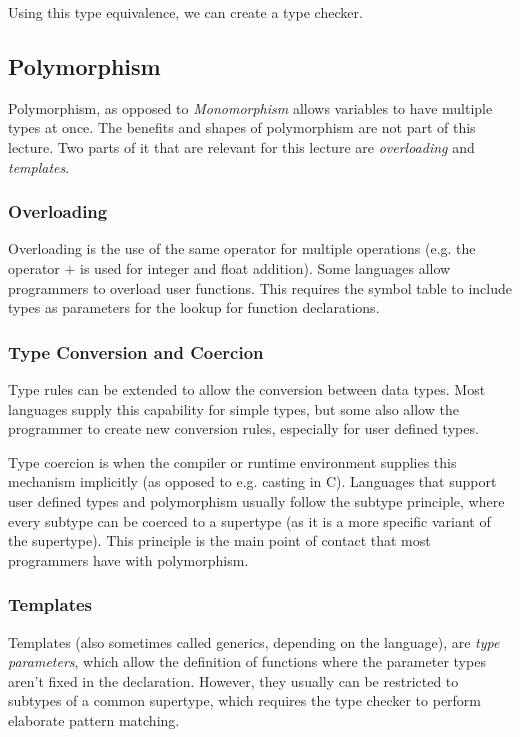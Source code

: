 \documentclass{article}
\begin{document}
Using this type equivalence, we can create a type checker.

\subsection{Polymorphism}
Polymorphism, as opposed to \emph{Monomorphism} allows variables to have multiple types at once.
The benefits and shapes of polymorphism are not part of this lecture.
Two parts of it that are relevant for this lecture are \emph{overloading} and \emph{templates}.

\subsubsection{Overloading}
Overloading is the use of the same operator for multiple operations (e.g. the operator $+$ is used for integer and float addition).
Some languages allow programmers to overload user functions.
This requires the symbol table to include types as parameters for the lookup for function declarations.

\subsubsection{Type Conversion and Coercion}
Type rules can be extended to allow the conversion between data types.
Most languages supply this capability for simple types, but some also allow the programmer to create new conversion rules, especially for user defined types.

Type coercion is when the compiler or runtime environment supplies this mechanism implicitly (as opposed to e.g. casting in C).
Languages that support user defined types and polymorphism usually follow the subtype principle, where every subtype can be coerced to a supertype (as it is a more specific variant of the supertype).
This principle is the main point of contact that most programmers have with polymorphism.

\subsubsection{Templates}
Templates (also sometimes called generics, depending on the language), are \emph{type parameters}, which allow the definition of functions where the parameter types aren't fixed in the declaration.
However, they usually can be restricted to subtypes of a common supertype, which requires the type checker to perform elaborate pattern matching.
\end{document}
